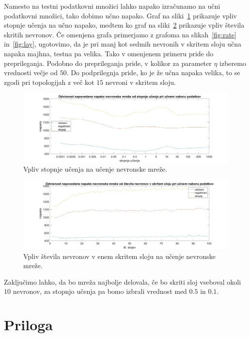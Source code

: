 \documentclass[mat1]{fmfdelo}
\begin{document}
Namesto na testni podatkovni množici lahko napako izračunamo na učni podatkovni množici, tako dobimo učno napako. Graf na sliki~\ref{fig:rate_l} prikazuje vpliv stopnje učenja na učno napako, medtem ko graf na sliki~\ref{fig:lay_l} prikazuje vpliv števila skritih nevronov. Če omenjena grafa primerjamo z grafoma na slikah~\ref{fig:rate} in~\ref{fig:lay}, ugotovimo, da je pri manj kot sedmih nevronih v skritem sloju učna napaka majhna, testna pa velika. Tako v omenjenem primeru pride do preprileganja. Podobno do preprileganja pride, v kolikor za parameter $\eta$ izberemo vrednosti večje od $50$. Do podprilegnja pride, ko je že učna napaka velika, to se zgodi pri topologijah z več kot $15$ nevroni v skritem sloju.
%
\begin{figure}[!h]
	\centering
	\includegraphics[width=1\textwidth]{rate_learn.jpg}
	\caption{Vpliv stopnje učenja na učenje nevronske mreže.}
	\label{fig:rate_l}
\end{figure}
%
\begin{figure}[!ht]
	\centering
	\includegraphics[width=1\textwidth]{lay_learned.jpg}
	\caption{Vpliv števila nevronov v enem skritem sloju na učenje nevronske mreže.}
	\label{fig:lay_l}
\end{figure}
%
Zaključimo lahko, da bo mreža najbolje delovala, če bo skriti sloj vseboval okoli $10$ nevronov, za stopnjo učenja pa bomo izbrali vrednost med $0.5$ in $0.1$.
%
\\
\section{Priloga} \label{priloga}
\inputminted{ocaml}{nevronske_mreze.ml}
\end{document}
